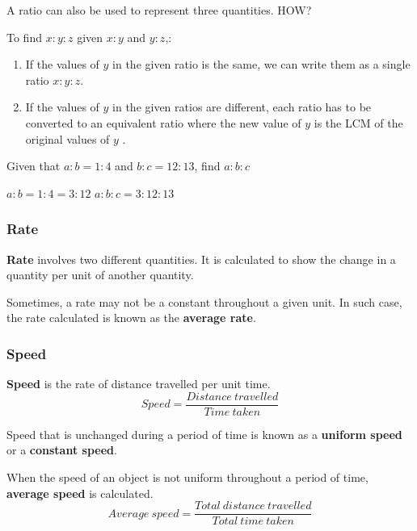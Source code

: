 \documentclass[../main]{subfiles}
\begin{document}
A ratio can also be used to represent three quantities. HOW?

To find \(x:y:z\) given \(x:y\) and \(y:z\),:
\begin{enumerate}
\item If the values of $y$ in the given ratio is the same, we can write them as
  a single ratio \(x:y:z\).
 
\item If the values of $y$ in the given ratios are different, each ratio has to
  be converted to an equivalent ratio where the new value of $y$ is the LCM of
  the original values of $y$ .
  
\end{enumerate}

Given that \(a:b=1:4\) and \(b:c=12:13\), find \(a:b:c\)

\(a:b=1:4 = 3:12\)
\(a:b:c=3:12:13\)

\subsubsection{Rate}
\textbf{Rate} involves two different quantities. It is calculated to show the
change in a quantity per unit of another quantity.

Sometimes, a rate may not be a constant throughout a given unit. In such case,
the rate calculated is known as the \textbf{average rate}.

\subsubsection{Speed}
\textbf{Speed} is the rate of distance travelled per unit time.
\[Speed = {\frac {Distance\ travelled} {Time\ taken}}\]


Speed that is unchanged during a period of time is known as a \textbf{uniform
  speed} or a \textbf{constant speed}.

When the speed of an object is not uniform throughout a period of time,
\textbf{average speed} is calculated.
\[Average\ speed={\frac {Total\ distance\ travelled} {Total \ time \ taken}}\]
\end{document}
